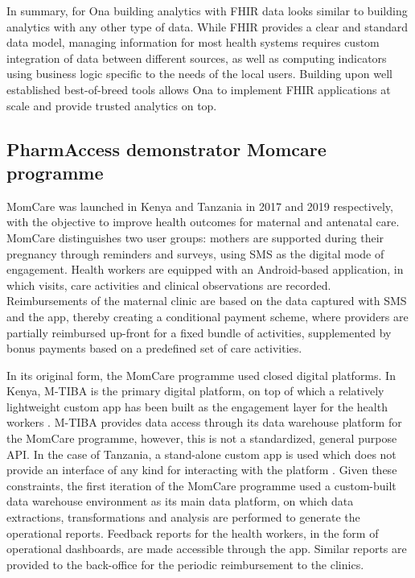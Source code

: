 \documentclass[
  authoryear]{elsarticle}
\begin{document}
In summary, for Ona building analytics with FHIR data looks similar to
building analytics with any other type of data. While FHIR provides a
clear and standard data model, managing information for most health
systems requires custom integration of data between different sources,
as well as computing indicators using business logic specific to the
needs of the local users. Building upon well established best-of-breed
tools allows Ona to implement FHIR applications at scale and provide
trusted analytics on top.

\subsection{PharmAccess demonstrator Momcare
programme}\label{pharmaccess-demonstrator-momcare-programme}

MomCare was launched in Kenya
\citep{huisman2022digital, sanctis2022maintaining} and Tanzania
\citep{shija2021access, mrema2021application} in 2017 and 2019
respectively, with the objective to improve health outcomes for maternal
and antenatal care. MomCare distinguishes two user groups: mothers are
supported during their pregnancy through reminders and surveys, using
SMS as the digital mode of engagement. Health workers are equipped with
an Android-based application, in which visits, care activities and
clinical observations are recorded. Reimbursements of the maternal
clinic are based on the data captured with SMS and the app, thereby
creating a conditional payment scheme, where providers are partially
reimbursed up-front for a fixed bundle of activities, supplemented by
bonus payments based on a predefined set of care activities.

In its original form, the MomCare programme used closed digital
platforms. In Kenya, M-TIBA is the primary digital platform, on top of
which a relatively lightweight custom app has been built as the
engagement layer for the health workers \citep{huisman2022digital}.
M-TIBA provides data access through its data warehouse platform for the
MomCare programme, however, this is not a standardized, general purpose
API. In the case of Tanzania, a stand-alone custom app is used which
does not provide an interface of any kind for interacting with the
platform \citep{mrema2021application}. Given these constraints, the
first iteration of the MomCare programme used a custom-built data
warehouse environment as its main data platform, on which data
extractions, transformations and analysis are performed to generate the
operational reports. Feedback reports for the health workers, in the
form of operational dashboards, are made accessible through the app.
Similar reports are provided to the back-office for the periodic
reimbursement to the clinics.
\end{document}
